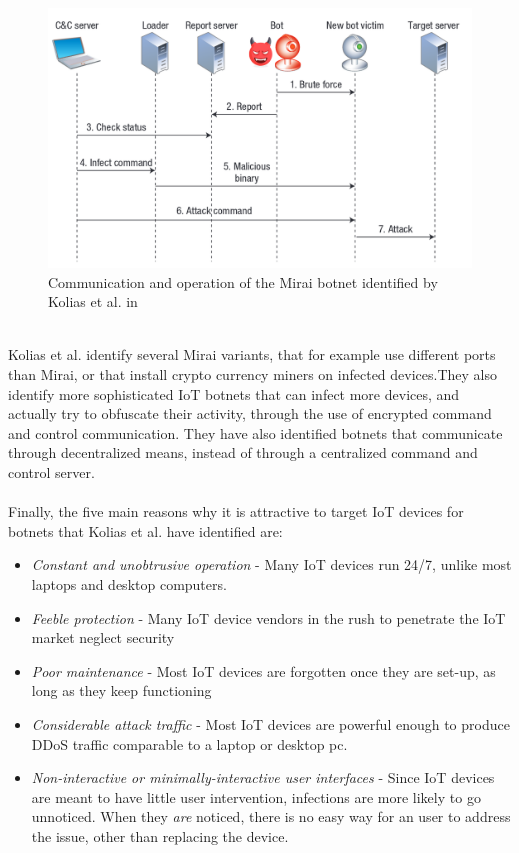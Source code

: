 \documentclass[a4paper,10pt]{article}
\begin{document}
\begin{figure}[hbtp]
 \centering
 \includegraphics[width=0.8\linewidth]{kolias.png}
 \caption{Communication and operation of the Mirai botnet identified by Kolias et al. in \cite{Kolias2017}}
 \label{fig:kolias_communication}
\end{figure}
~\\
Kolias et al. identify several Mirai variants, that for example use different ports than Mirai, or that install crypto currency
miners on infected devices.They also identify more sophisticated IoT botnets that can infect more devices, and actually
try to obfuscate their activity, through the use of encrypted command and control communication. They have also 
identified botnets that communicate through decentralized means, instead of through a centralized command and 
control server.
\\\\
Finally, the five main reasons why it is attractive to target IoT devices for botnets that Kolias et al. have identified are:
\begin{itemize}
 \item \textit{Constant and unobtrusive operation} - Many IoT devices run 24/7, unlike most laptops and desktop 
 computers.
 \item \textit{Feeble protection} - Many IoT device vendors in the rush to penetrate the IoT market neglect security
 \item \textit{Poor maintenance} - Most IoT devices are forgotten once they are set-up, as long as they keep functioning
 \item \textit{Considerable attack traffic} - Most IoT devices are powerful enough to produce DDoS traffic comparable 
 to a laptop or desktop pc.
 \item \textit{Non-interactive or minimally-interactive user interfaces} - Since IoT devices are meant to have little user 
 intervention, infections are more likely to go unnoticed. When they \textit{are} noticed, there is no easy way for an user
 to address the issue, other than replacing the device.
\end{itemize}
\end{document}
